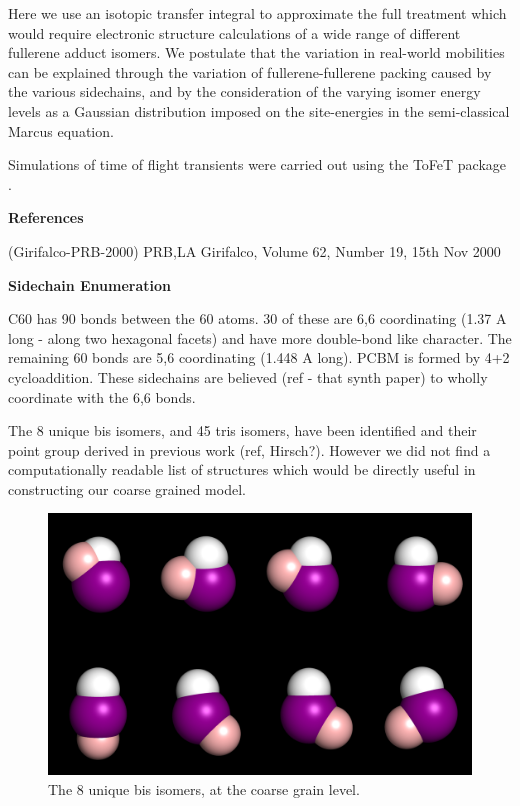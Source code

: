 \documentclass[journal=nanofd,manuscript=suppinfo]{achemso}
\begin{document}
Here we use an isotopic transfer integral to approximate the full treatment which would require electronic structure calculations of a wide range of different fullerene adduct isomers.
We postulate that the variation in real-world mobilities can be explained through the variation of fullerene-fullerene packing caused by the various sidechains, and by the consideration of the varying isomer energy levels \cite{Jarvist_AM_2010} as a Gaussian distribution imposed on the site-energies in the semi-classical Marcus equation.


Simulations of time of flight transients were carried out using the ToFeT package \cite{ToFeT}.

\textbf{References}

(Girifalco-PRB-2000) PRB,LA Girifalco, Volume 62, Number 19, 15th Nov 2000


\textbf{Sidechain Enumeration}

C60 has 90 bonds between the 60 atoms. 30 of these are 6,6 coordinating (1.37
A long - along two hexagonal facets) and have more double-bond like character.
The remaining 60 bonds are 5,6 coordinating (1.448 A long). PCBM is formed by
4+2 cycloaddition.
These sidechains are believed (ref - that synth paper) to
wholly coordinate with the 6,6 bonds.

The 8 unique bis isomers, and 45 tris isomers, have been identified and their
point group derived in previous work (ref, Hirsch?).
However we did not find a computationally readable list of structures which
would be directly useful in constructing our coarse grained model.

\begin{figure}[ht!]
    \begin{center}
        \includegraphics[width=\textwidth]{bis_8_isomers_ray.png}
            \caption{\label{fig-8bisCG}The 8 unique bis isomers, at the coarse grain level.}
    \end{center}
\end{figure}
\end{document}
